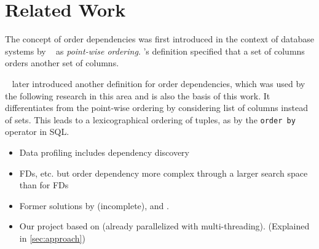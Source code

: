 
\section{Related Work}\label{sec:related_work}
  The concept of order dependencies was first introduced in the context of database systems by \citeauthor{ginsburg}~\cite{ginsburg} as \textit{point-wise ordering}.
  \citeauthor{ginsburg}'s definition specified that a set of columns orders another set of columns.

  \citeauthor{szlichta:fundamentals}~\cite{szlichta:fundamentals} later introduced another definition for order dependencies, which was used by the following research in this area \cite{consonni, langer, szlichta:discovery} and is also the basis of this work.
  It differentiates from the point-wise ordering by considering list of columns instead of sets.
  This leads to a lexicographical ordering of tuples, as by the \texttt{order by} operator in SQL.

  \begin{itemize}
    \item Data profiling includes dependency discovery
    \item FDs, etc. but order dependency more complex through a larger search space than for FDs
    \item Former solutions by \cite{langer} (incomplete), \cite{szlichta:discovery} and \cite{consonni}.
    \item Our project based on \cite{consonni} (already parallelized with multi-threading). (Explained in \ref{sec:approach})
  \end{itemize}